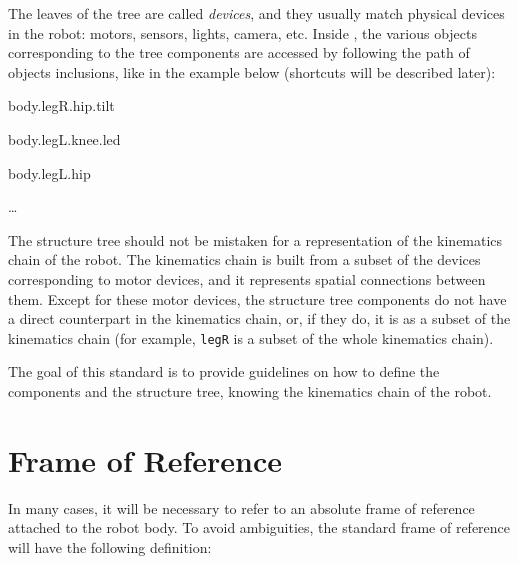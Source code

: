 \begin{figure}
\centering
\end{figure}

The leaves of the tree are called
\textit{devices}, and they usually match physical
devices in the robot: motors, sensors, lights, camera, etc. Inside
\urbi, the various objects corresponding to the tree components are
accessed by following the path of objects inclusions, like in the
example below (shortcuts will be described later):

{
body.legR.hip.tilt}

{
body.legL.knee.led}

{
body.legL.hip}

{
…}


The structure tree should not be mistaken for a representation of the
kinematics chain of the robot. The kinematics chain is built from a
subset of the devices corresponding to motor devices, and it represents
spatial connections between them. Except for these motor devices, the
structure tree components do not have a direct counterpart in the
kinematics chain, or, if they do, it is as a subset of the kinematics
chain (for example, \texttt{legR} is a subset of the whole kinematics
chain).


The goal of this standard is to provide guidelines on how to define the
components and the structure tree, knowing the kinematics chain of the
robot.

\section{Frame of Reference}

In many cases, it will be necessary to refer to an absolute frame of
reference attached to the robot body. To avoid ambiguities, the
standard frame of reference will have the following definition:

\begin{figure}

\end{figure}

